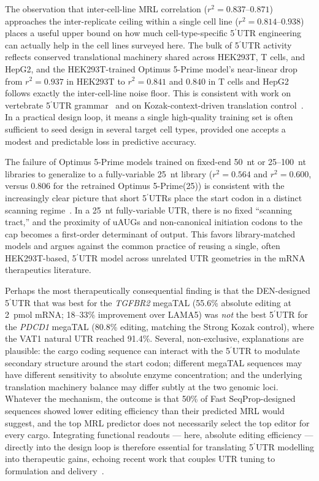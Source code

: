 \documentclass[11pt]{article}
\begin{document}
The observation that inter-cell-line MRL correlation
($r^{2} = 0.837$--$0.871$) approaches the inter-replicate ceiling
within a single cell line ($r^{2} = 0.814$--$0.938$) places a useful
upper bound on how much cell-type-specific 5$^\prime$UTR engineering
can actually help in the cell lines surveyed here. The bulk of
5$^\prime$UTR activity reflects conserved translational machinery
shared across HEK293T, T cells, and HepG2, and the HEK293T-trained
Optimus 5-Prime model's near-linear drop from $r^{2} = 0.937$ in
HEK293T to $r^{2} = 0.841$ and $0.840$ in T cells and HepG2 follows
exactly the inter-cell-line noise floor. This is consistent with work
on vertebrate 5$^\prime$UTR grammar~\citep{reimaopinto2025danio5p,
strayer2024naptrap} and on Kozak-context-driven translation
control~\citep{chaldebas2026utrvariants,stettler2026kozak}. In a
practical design loop, it means a single high-quality training set is
often sufficient to seed design in several target cell types, provided
one accepts a modest and predictable loss in predictive accuracy.

The failure of Optimus 5-Prime models trained on fixed-end 50~nt or
25--100~nt libraries to generalize to a fully-variable 25~nt library
($r^{2} = 0.564$ and $r^{2} = 0.600$, versus $0.806$ for the retrained
Optimus 5-Prime(25)) is consistent with the increasingly clear picture
that short 5$^\prime$UTRs place the start codon in a distinct scanning
regime~\citep{chaldebas2026utrvariants,balasov2025kozaknoncanonical,
shikalov2021ddx3}. In a 25~nt fully-variable UTR, there is no fixed
``scanning tract,'' and the proximity of uAUGs and non-canonical
initiation codons to the cap becomes a first-order determinant of
output. This favors library-matched models and argues against the
common practice of reusing a single, often HEK293T-based, 5$^\prime$UTR
model across unrelated UTR geometries in the mRNA therapeutics literature.

Perhaps the most therapeutically consequential finding is that the
DEN-designed 5$^\prime$UTR that was best for the \emph{TGFBR2} megaTAL
(55.6\% absolute editing at 2~pmol mRNA; 18--33\% improvement over
LAMA5) was \emph{not} the best 5$^\prime$UTR for the \emph{PDCD1}
megaTAL (80.8\% editing, matching the Strong Kozak control), where the
VAT1 natural UTR reached 91.4\%. Several, non-exclusive, explanations
are plausible: the cargo coding sequence can interact with the
5$^\prime$UTR to modulate secondary structure around the start codon;
different megaTAL sequences may have different sensitivity to absolute
enzyme concentration; and the underlying translation machinery balance
may differ subtly at the two genomic loci. Whatever the mechanism,
the outcome is that 50\% of Fast SeqProp-designed sequences showed
lower editing efficiency than their predicted MRL would suggest, and
the top MRL predictor does not necessarily select the top editor for
every cargo. Integrating functional readouts --- here, absolute
editing efficiency --- directly into the design loop is therefore
essential for translating 5$^\prime$UTR modelling into therapeutic
gains, echoing recent work that couples UTR tuning to formulation
and delivery~\citep{kim2026lnp_utr,phua2026ns1translation}.
\end{document}
